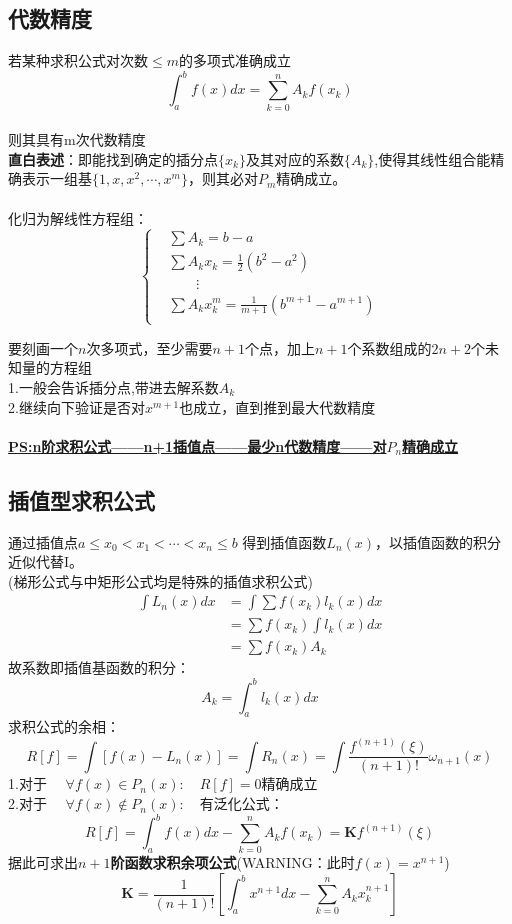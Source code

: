 \documentclass[12pt]{article}
\begin{document}
\begin{CJK*}{UTF8}{gbsn}
\begin{spacing}{1.5}
\subsection{代数精度}
    若某种求积公式对次数$\leq m$的多项式准确成立 \\
    $$\int_a^b f(x)dx = \sum_{k=0}^{n}A_kf(x_k)$$  \\
    则其具有m次代数精度\\
    \textbf{直白表述}：即能找到确定的插分点$\{x_k\}$及其对应的系数$\{A_k\}$,使得其线性组合能精确表示一组基$\{1,x,x^2,\cdots,x^m\}$，则其必对$P_m$精确成立。\\ 
    \\
    化归为解线性方程组：\\
    $$
    \left \{
    \begin{aligned}
        &\sum A_k = b-a\\
        &\sum A_k x_k = \frac{1}{2}(b^2-a^2)\\
        &\qquad    \vdots \\
        &\sum A_k x^m_k = \frac{1}{m+1}(b^{m+1}-a^{m+1})\\
    \end{aligned}
    \right.
    $$
    
    要刻画一个$n$次多项式，至少需要$n+1$个点，加上$n+1$个系数组成的$2n+2$个未知量的方程组\\
    1.一般会告诉插分点,带进去解系数$A_k$\\
    2.继续向下验证是否对$x^{m+1}$也成立，直到推到最大代数精度\\\\
    \textbf{\underline{PS:n阶求积公式——n+1插值点——最少n代数精度——对$P_n$精确成立}}

\newpage
\subsection{插值型求积公式}
    通过插值点$a\leq x_0 < x_1 < \cdots < x_n \leq b$ 得到插值函数$L_n(x)$，以插值函数的积分近似代替I。\\
    (梯形公式与中矩形公式均是特殊的插值求积公式)\\
    $$
    \begin{aligned}
        \int L_n(x)dx &= \int \sum f(x_k)l_k(x)dx  \\
                      &= \sum f(x_k) \int l_k(x)dx \\
                      &= \sum  f(x_k)A_k
    \end{aligned}
    $$
    故系数即插值基函数的积分：
    $$A_k = \int_a^bl_k(x)dx $$
    求积公式的余相：
    $$R[f] = \int[f(x) - L_n(x)] = \int R_n(x)
            = \int \frac{f^{(n+1)}(\xi)}{(n+1)!}\omega_{n+1}(x)
    $$
    1.对于 $\quad \forall f(x) \in P_n(x): \quad  R[f] = 0$精确成立\\
    2.对于 $\quad \forall f(x) \notin P_n(x):\quad$有泛化公式：
    $$
        R[f] = \int_a^b f(x)dx - \sum_{k=0}^n A_k f(x_k) = \boldsymbol{K}f^{(n+1)}(\xi)
    $$
    据此可求出\textbf{$n+1$阶函数求积余项公式}(WARNING：此时$f(x) = x^{n+1}$)\\
    $$    \boldsymbol{K} = \frac{1}{(n+1)!}[\int_a^b x^{n+1}dx - \sum_{k=0}^n A_k x_k^{n+1}]
    $$
\newpage

\end{spacing}
\end{CJK*}
\end{document}
